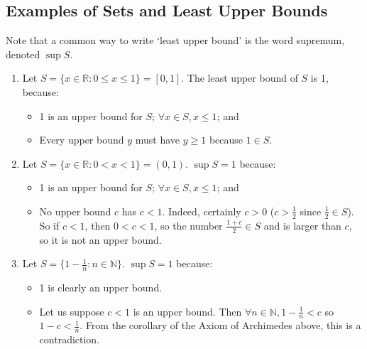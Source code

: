 \subsection{Examples of Sets and Least Upper Bounds}
Note that a common way to write `least upper bound' is the word supremum, denoted $\sup S$.
\begin{enumerate}
	\item Let $S = \{ x \in \mathbb R: 0 \leq x \leq 1 \} = [0, 1]$. The least upper bound of $S$ is 1, because:
	      \begin{itemize}
		      \item 1 is an upper bound for $S$; $\forall x \in S, x\leq1 $; and
		      \item Every upper bound $y$ must have $y \geq 1$ because $1 \in S$.
	      \end{itemize}
	\item Let $S = \{ x \in \mathbb R: 0 < x < 1 \} = (0, 1)$. $\sup S = 1$ because:
	      \begin{itemize}
		      \item 1 is an upper bound for $S$; $\forall x \in S, x \leq 1$; and
		      \item No upper bound $c$ has $c<1$. Indeed, certainly $c>0$ ($c > \frac{1}{2}$ since $\frac{1}{2} \in S$). So if $c<1$, then $0<c<1$, so the number $\frac{1+c}{2} \in S$ and is larger than $c$, so it is not an upper bound.
	      \end{itemize}
	\item Let $S = \{ 1 - \frac{1}{n}: n \in \mathbb N \}$. $\sup S = 1$ because:
	      \begin{itemize}
		      \item 1 is clearly an upper bound.
		      \item Let us suppose $c < 1$ is an upper bound. Then $\forall n \in \mathbb N, 1 - \frac{1}{n} < c$ so $1 - c < \frac{1}{n}$. From the corollary of the Axiom of Archimedes above, this is a contradiction.
	      \end{itemize}
\end{enumerate}

